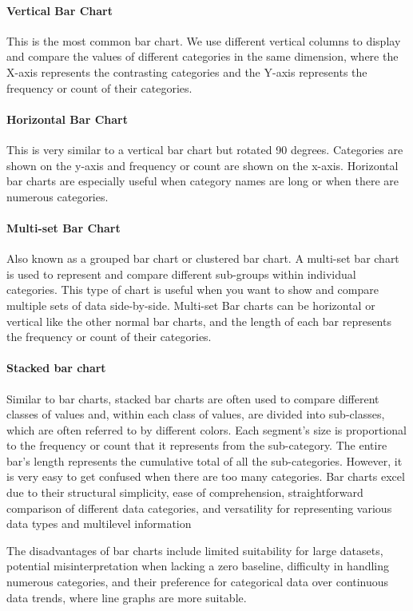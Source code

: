 \documentclass{article}\usepackage[]{graphicx}\usepackage[]{xcolor}
\begin{document}
\paragraph{Vertical Bar Chart}
This is the most common bar chart. We use different vertical columns to display and compare the values of different categories in the same dimension, where the X-axis represents the contrasting categories and the Y-axis represents the frequency or count of their categories.\\
\paragraph{Horizontal Bar Chart}
This is very similar to a vertical bar chart but rotated 90 degrees. Categories are shown on the y-axis and frequency or count are shown on the x-axis. Horizontal bar charts are especially useful when category names are long or when there are numerous categories.
\paragraph{Multi-set Bar Chart}
Also known as a grouped bar chart or clustered bar chart. A multi-set bar chart is used to represent and compare different sub-groups within individual categories. This type of chart is useful when you want to show and compare multiple sets of data side-by-side.
Multi-set Bar charts can be horizontal or vertical like the other normal bar charts, and the length of each bar represents the frequency or count of their categories.
\paragraph{Stacked bar chart}
Similar to bar charts, stacked bar charts are often used to compare different classes of values and, within each class of values, are divided into sub-classes, which are often referred to by different colors. Each segment's size is proportional to the frequency or count that it represents from the sub-category. The entire bar's length represents the cumulative total of all the sub-categories.
However, it is very easy to get confused when there are too many categories.
Bar charts excel due to their structural simplicity, ease of comprehension, straightforward comparison of different data categories, and versatility for representing various data types and multilevel information

The disadvantages of bar charts include limited suitability for large datasets, potential misinterpretation when lacking a zero baseline, difficulty in handling numerous categories, and their preference for categorical data over continuous data trends, where line graphs are more suitable.
\end{document}
